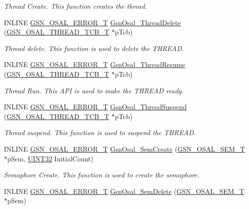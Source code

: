 \begin{DoxyCompactItemize}
\begin{DoxyCompactList}\small\item\em Thread Create. This function creates the thread. \end{DoxyCompactList}\item 
INLINE \hyperlink{a00659_ga36216a7aacd1d5024bc7b8bf39c3f46b}{GSN\_\-OSAL\_\-ERROR\_\-T} \hyperlink{a00628_ga5a127d54a6f2daed4353bea344e40ee5}{GsnOsal\_\-ThreadDelete} (\hyperlink{a00628_ga43c1eefe78fa26e478301976f96ac31f}{GSN\_\-OSAL\_\-THREAD\_\-TCB\_\-T} $\ast$pTcb)
\begin{DoxyCompactList}\small\item\em Thread delete. This function is used to delete the THREAD. \end{DoxyCompactList}\item 
INLINE \hyperlink{a00659_ga36216a7aacd1d5024bc7b8bf39c3f46b}{GSN\_\-OSAL\_\-ERROR\_\-T} \hyperlink{a00628_gaa895749a7c406cfe155217c8c1d57328}{GsnOsal\_\-ThreadResume} (\hyperlink{a00628_ga43c1eefe78fa26e478301976f96ac31f}{GSN\_\-OSAL\_\-THREAD\_\-TCB\_\-T} $\ast$pTcb)
\begin{DoxyCompactList}\small\item\em Thread Run. This API is used to make the THREAD ready. \end{DoxyCompactList}\item 
INLINE \hyperlink{a00659_ga36216a7aacd1d5024bc7b8bf39c3f46b}{GSN\_\-OSAL\_\-ERROR\_\-T} \hyperlink{a00628_gabd439d54a7fcf906224267e15796287c}{GsnOsal\_\-ThreadSuspend} (\hyperlink{a00628_ga43c1eefe78fa26e478301976f96ac31f}{GSN\_\-OSAL\_\-THREAD\_\-TCB\_\-T} $\ast$pTcb)
\begin{DoxyCompactList}\small\item\em Thread suspend. This function is used to suspend the THREAD. \end{DoxyCompactList}\item 
INLINE \hyperlink{a00659_ga36216a7aacd1d5024bc7b8bf39c3f46b}{GSN\_\-OSAL\_\-ERROR\_\-T} \hyperlink{a00628_ga9ef6b89b782f89f0141efac133b6534b}{GsnOsal\_\-SemCreate} (\hyperlink{a00628_gab4b3554407ce22b940e2fcd3faf5fd47}{GSN\_\-OSAL\_\-SEM\_\-T} $\ast$pSem, \hyperlink{a00660_gae1e6edbbc26d6fbc71a90190d0266018}{UINT32} InitialCount)
\begin{DoxyCompactList}\small\item\em Semaphore Create. This function is used to create the semaphore. \end{DoxyCompactList}\item 
INLINE \hyperlink{a00659_ga36216a7aacd1d5024bc7b8bf39c3f46b}{GSN\_\-OSAL\_\-ERROR\_\-T} \hyperlink{a00628_ga3542986ec14bf1b3377b3908fb661109}{GsnOsal\_\-SemDelete} (\hyperlink{a00628_gab4b3554407ce22b940e2fcd3faf5fd47}{GSN\_\-OSAL\_\-SEM\_\-T} $\ast$pSem)

\end{DoxyCompactItemize}
